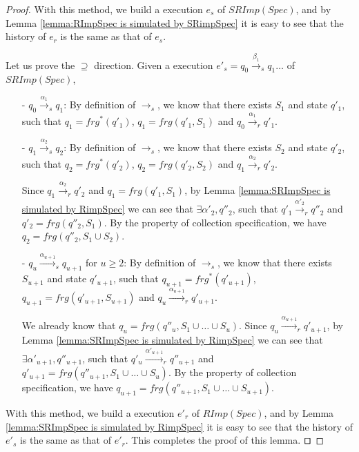 \begin {proof}
With this method, we build a execution $e_s$ of $\mathit{SRImp}(\mathit{Spec})$, and by Lemma \ref{lemma:RImpSpec is simulated by SRimpSpec} it is easy to see that the history of $e_r$ is the same as that of $e_s$.

Let us prove the $\supseteq$ direction. Given a execution $e'_s = q_0 {\xrightarrow{\beta_1}}_s q_1 \ldots$ of $\mathit{SRImp}(\mathit{Spec})$,

\begin{itemize}
\setlength{\itemsep}{0.5pt}
\item[-] $q_0 {\xrightarrow{\alpha_1}}_s q_1$: By definition of $\rightarrow_s$, we know that there exists $S_1$ and state $q'_1$, such that $q_1 = \mathit{frg}^*(q'_1)$, $q_1 = \mathit{frg}(q'_1,S_1)$ and $q_0 {\xrightarrow{\alpha_1}}_r q'_1$.

\item[-] $q_1 {\xrightarrow{\alpha_2}}_s q_2$: By definition of $\rightarrow_s$, we know that there exists $S_2$ and state $q'_2$, such that $q_2 = \mathit{frg}^*(q'_2)$, $q_2 = \mathit{frg}(q'_2,S_2)$ and $q_1 {\xrightarrow{\alpha_2}}_r q'_2$.

    Since $q_1 {\xrightarrow{\alpha_2}}_r q'_2$ and $q_1 = \mathit{frg}(q'_1,S_1)$, by Lemma \ref{lemma:SRImpSpec is simulated by RimpSpec} we can see that $\exists \alpha'_2, q''_2$, such that $q'_1 {\xrightarrow{\alpha'_2}}_r q''_2$ and $q'_2 = \mathit{frg}(q''_2,S_1)$. By the property of collection specification, we have $q_2 = \mathit{frg}(q''_2,S_1 \cup S_2)$.

\item[-] $q_u {\xrightarrow{\alpha_{u+1}}}_s q_{u+1}$ for $u \geq 2$: By definition of $\rightarrow_s$, we know that there exists $S_{u+1}$ and state $q'_{u+1}$, such that $q_{u+1} = \mathit{frg}^*(q'_{u+1})$, $q_{u+1} = \mathit{frg}(q'_{u+1},S_{u+1})$ and $q_u {\xrightarrow{\alpha_{u+1}}}_r q'_{u+1}$.

    We already know that $q_u = \mathit{frg}(q''_u,S_1 \cup \ldots \cup S_u)$. Since $q_u {\xrightarrow{\alpha_{u+1}}}_r q'_{u+1}$, by Lemma \ref{lemma:SRImpSpec is simulated by RimpSpec} we can see that $\exists \alpha'_{u+1}, q''_{u+1}$, such that $q'_u {\xrightarrow{\alpha'_{u+1}}}_r q''_{u+1}$ and $q'_{u+1} = \mathit{frg}(q''_{u+1},S_1 \cup \ldots \cup S_u)$. By the property of collection specification, we have $q_{u+1} = \mathit{frg}(q''_{u+1},S_1 \cup \ldots \cup S_{u+1})$.
\end{itemize}

With this method, we build a execution $e'_r$ of $\mathit{RImp}(\mathit{Spec})$, and by Lemma \ref{lemma:SRImpSpec is simulated by RimpSpec} it is easy to see that the history of $e'_s$ is the same as that of $e'_r$. This completes the proof of this lemma. $\qed$
\end {proof}


